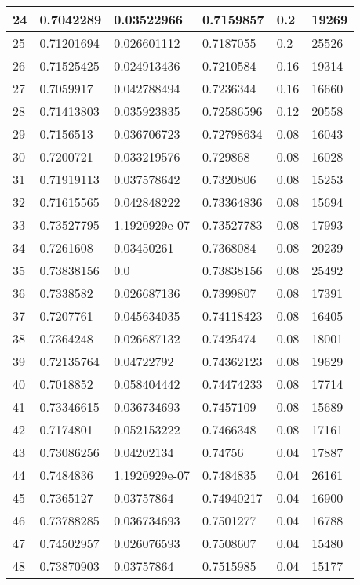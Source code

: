 \begin{longtable}{|l|l|l|l|l|l|}
24 & 0.7042289 & 0.03522966 & 0.7159857 & 0.2 & 19269 \\ \hline 
25 & 0.71201694 & 0.026601112 & 0.7187055 & 0.2 & 25526 \\ \hline 
26 & 0.71525425 & 0.024913436 & 0.7210584 & 0.16 & 19314 \\ \hline 
27 & 0.7059917 & 0.042788494 & 0.7236344 & 0.16 & 16660 \\ \hline 
28 & 0.71413803 & 0.035923835 & 0.72586596 & 0.12 & 20558 \\ \hline 
29 & 0.7156513 & 0.036706723 & 0.72798634 & 0.08 & 16043 \\ \hline 
30 & 0.7200721 & 0.033219576 & 0.729868 & 0.08 & 16028 \\ \hline 
31 & 0.71919113 & 0.037578642 & 0.7320806 & 0.08 & 15253 \\ \hline 
32 & 0.71615565 & 0.042848222 & 0.73364836 & 0.08 & 15694 \\ \hline 
33 & 0.73527795 & 1.1920929e-07 & 0.73527783 & 0.08 & 17993 \\ \hline 
34 & 0.7261608 & 0.03450261 & 0.7368084 & 0.08 & 20239 \\ \hline 
35 & 0.73838156 & 0.0 & 0.73838156 & 0.08 & 25492 \\ \hline 
36 & 0.7338582 & 0.026687136 & 0.7399807 & 0.08 & 17391 \\ \hline 
37 & 0.7207761 & 0.045634035 & 0.74118423 & 0.08 & 16405 \\ \hline 
38 & 0.7364248 & 0.026687132 & 0.7425474 & 0.08 & 18001 \\ \hline 
39 & 0.72135764 & 0.04722792 & 0.74362123 & 0.08 & 19629 \\ \hline 
40 & 0.7018852 & 0.058404442 & 0.74474233 & 0.08 & 17714 \\ \hline 
41 & 0.73346615 & 0.036734693 & 0.7457109 & 0.08 & 15689 \\ \hline 
42 & 0.7174801 & 0.052153222 & 0.7466348 & 0.08 & 17161 \\ \hline 
43 & 0.73086256 & 0.04202134 & 0.74756 & 0.04 & 17887 \\ \hline 
44 & 0.7484836 & 1.1920929e-07 & 0.7484835 & 0.04 & 26161 \\ \hline 
45 & 0.7365127 & 0.03757864 & 0.74940217 & 0.04 & 16900 \\ \hline 
46 & 0.73788285 & 0.036734693 & 0.7501277 & 0.04 & 16788 \\ \hline 
47 & 0.74502957 & 0.026076593 & 0.7508607 & 0.04 & 15480 \\ \hline 
48 & 0.73870903 & 0.03757864 & 0.7515985 & 0.04 & 15177 \\ \hline 

\end{longtable}
